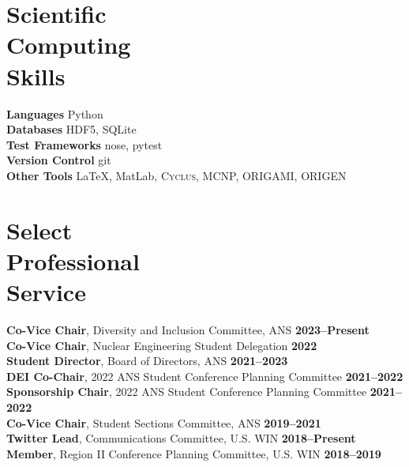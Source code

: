 \documentclass[margin,line]{resume}
\newcommand{\Cyclus}{\textsc{Cyclus}\xspace}%
\begin{document}
\begin{resume}
    \section{\mysidestyle Scientific\\Computing\\Skills}
                \textbf{Languages} \hfill Python\vspace{.5mm}\\%
                \textbf{Databases} \hfill HDF5, SQLite\vspace{.5mm}\\%
                \textbf{Test Frameworks} \hfill nose, pytest\vspace{.5mm}\\%
                \textbf{Version Control} \hfill git\vspace{.5mm}\\%
                \textbf{Other Tools} \hfill \LaTeX, MatLab, \Cyclus, MCNP, ORIGAMI, ORIGEN\vspace{.5mm}%
        \vspace{-5mm}

    \section{\mysidestyle Select\\Professional\\Service}
                \textbf{Co-Vice Chair}, Diversity and Inclusion Committee, ANS  \hfill \textbf{2023--Present}\vspace{.5mm}\\%
                \textbf{Co-Vice Chair}, Nuclear Engineering Student Delegation \hfill\textbf{2022}\\
                \textbf{Student Director}, Board of Directors, ANS \hfill \textbf{2021--2023}\vspace{.5mm}\\%
                \textbf{DEI Co-Chair}, 2022 ANS Student Conference Planning Committee \hfill \textbf{2021--2022}\vspace{.5mm}\\%
                \textbf{Sponsorship Chair}, 2022 ANS Student Conference Planning Committee \hfill \textbf{2021--2022}\vspace{.5mm}\\%
                \textbf{Co-Vice Chair}, Student Sections Committee, ANS \hfill \textbf{2019--2021}\\
                \textbf{Twitter Lead}, Communications Committee, U.S. WIN  \hfill \textbf{2018--Present}\vspace{.5mm}\\%
                \textbf{Member}, Region II Conference Planning Committee, U.S. WIN  \hfill \textbf{2018--2019}\vspace{0mm}\\%



\end{resume}
\end{document}
